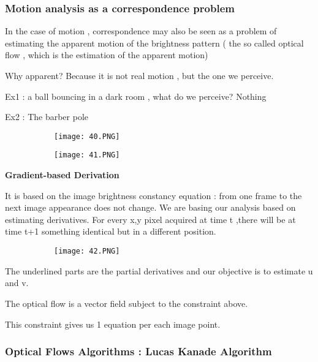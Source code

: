 \documentclass{article}
\begin{document}
\subsubsection{Motion analysis as a correspondence problem}

In the case of motion , correspondence may also be seen as a problem of estimating the apparent motion of the brightness pattern ( the so called optical flow , which is the estimation of the apparent motion)

Why apparent? Because it is not real motion , but the one we perceive.

Ex1 : a ball bouncing in a dark room , what do we perceive? Nothing

Ex2 : The barber pole


\begin{figure}[ht!]
  \centering
  \begin{subfigure}[b]{0.5\linewidth}
    \texttt{[image: 40.PNG]}
  \end{subfigure}
     \begin{subfigure}[b]{0.49\textwidth}
         \centering
         \texttt{[image: 41.PNG]}
     \end{subfigure}
\end{figure}

\textbf{Gradient-based Derivation}

It is based on the image brightness constancy equation : from one frame to the next image appearance does not change.
We are basing our analysis based on estimating derivatives. For every x,y pixel acquired at time t ,there will be at time t+1 something identical but in a different position.

\begin{figure}[ht!]
  \centering
  \begin{subfigure}[b]{0.7\linewidth}
    \texttt{[image: 42.PNG]}
  \end{subfigure}
\end{figure}

The underlined parts are the partial derivatives and our objective is to estimate u and v.

The optical flow is a vector field subject to the constraint above.

This constraint gives us 1 equation per each image point.

\subsubsection{Optical Flows Algorithms : Lucas Kanade Algorithm}
\end{document}
